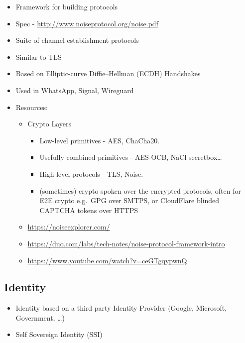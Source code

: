 \begin{itemize}
\tightlist
\item
  Framework for building protocols
\item
  Spec - \url{http://www.noiseprotocol.org/noise.pdf}
\item
  Suite of channel establishment protocols
\item
  Similar to TLS
\item
  Based on Elliptic-curve Diffie--Hellman (ECDH) Handshakes
\item
  Used in WhatsApp, Signal, Wireguard
\item
  Resources:

  \begin{itemize}
  \tightlist
  \item
    Crypto Layers

    \begin{itemize}
    \tightlist
    \item
      Low-level primitives - AES, ChaCha20.
    \item
      Usefully combined primitives - AES-OCB, NaCl secretbox\ldots{}
    \item
      High-level protocols - TLS, Noise.
    \item
      (sometimes) crypto spoken over the encrypted protocols, often for
      E2E crypto e.g.~GPG over SMTPS, or CloudFlare blinded CAPTCHA
      tokens over HTTPS
    \end{itemize}
  \item
    \url{https://noiseexplorer.com/}
  \item
    \url{https://duo.com/labs/tech-notes/noise-protocol-framework-intro}
  \item
    \url{https://www.youtube.com/watch?v=ceGTgqypwnQ}
  \end{itemize}
\end{itemize}

\hypertarget{identity}{%
\subsection{Identity}\label{identity}}

\begin{itemize}
\tightlist
\item
  Identity based on a third party Identity Provider (Google, Microsoft,
  Government, \ldots)
\item
  Self Sovereign Identity (SSI)
\end{itemize}

